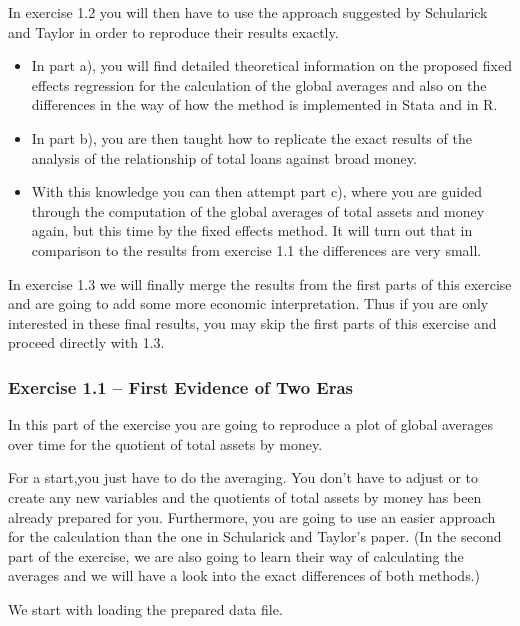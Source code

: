 \documentclass[a4paper,11pt,abstract=on]{scrartcl}
\begin{document}
{In exercise 1.2 you will then have to use the approach suggested by
Schularick and Taylor in order to reproduce their results exactly.

\begin{itemize}
\itemsep1pt\parskip0pt
\item
  In part a), you will find detailed theoretical information on the
  proposed fixed effects regression for the calculation of the global
  averages and also on the differences in the way of how the method is
  implemented in Stata and in R.
\item
  In part b), you are then taught how to replicate the exact results of
  the analysis of the relationship of total loans against broad money.
\item
  With this knowledge you can then attempt part c), where you are guided
  through the computation of the global averages of total assets and
  money again, but this time by the fixed effects method. It will turn
  out that in comparison to the results from exercise 1.1 the
  differences are very small.
\end{itemize}

In exercise 1.3 we will finally merge the results from the first parts
of this exercise and are going to add some more economic
interpretation. Thus if you are only interested in these final results,
you may skip the first parts of this exercise and proceed directly with
1.3.

\subsubsection{\sf Exercise 1.1 -- First Evidence of Two Eras}\label{exercise-1ux5f1-credit-and-money-first-evidence-of-two-eras}

In this part of the exercise you are going to reproduce a plot of global
averages over time for the quotient of total assets by money.

For a start,you just have to do the averaging. You don't have to adjust
or to create any new variables and the quotients of total assets by
money has been already prepared for you. Furthermore, you are going to
use an easier approach for the calculation than the one in Schularick
and Taylor's paper. (In the second part of the exercise, we are also
going to learn their way of calculating the averages and we will have a
look into the exact differences of both methods.)

We start with loading the prepared data file.

}
\end{document}
